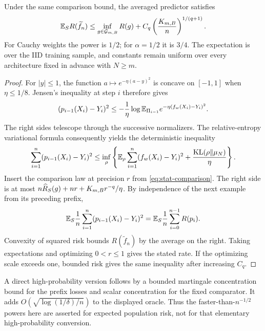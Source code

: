 \begin{corollary}
\label{cor:progressive-average}
Under the same comparison bound, the averaged predictor satisfies
\[
 \mathbb E_S R(\widetilde f_n)
 \le\inf_{g\in\mathcal G_{m,B}}R(g)
       +C_q\left(\frac{K_{m,B}}n\right)^{1/(q+1)}.
\]
For Cauchy weights the power is $1/2$; for $\alpha=1/2$ it is $3/4$. The expectation is over the IID training sample, and constants remain uniform over every architecture fixed in advance with $N\ge m$.
\end{corollary}
\begin{proof}
For $|y|\le1$, the function $a\mapsto e^{-\eta(a-y)^2}$ is concave on $[-1,1]$ when $\eta\le1/8$. Jensen's inequality at step $i$ therefore gives
\[
 (p_{i-1}(X_i)-Y_i)^2\le
 -\frac1\eta\log\mathbb E_{\Pi_{i-1}}e^{-\eta(f_w(X_i)-Y_i)^2}.
\]
The right sides telescope through the successive normalizers. The relative-entropy variational formula consequently yields the deterministic inequality
\[
 \sum_{i=1}^n(p_{i-1}(X_i)-Y_i)^2
 \le\inf_\rho\left\{\mathbb E_\rho\sum_{i=1}^n(f_w(X_i)-Y_i)^2
                          +\frac{\operatorname{KL}(\rho\Vert\mu_N)}\eta\right\}.
\]
Insert the comparison law at precision $r$ from \eqref{eq:stat-comparison}. The right side is at most
$n\widehat R_S(g)+nr+K_{m,B}r^{-q}/\eta$.
By independence of the next example from its preceding prefix,
\[
 \mathbb E_S\frac1n\sum_{i=1}^n(p_{i-1}(X_i)-Y_i)^2
     =\mathbb E_S\frac1n\sum_{i=0}^{n-1}R(p_i).
\]
Convexity of squared risk bounds $R(\widetilde f_n)$ by the average on the right. Taking expectations and optimizing $0<r\le1$ gives the stated rate. If the optimizing scale exceeds one, bounded risk gives the same inequality after increasing $C_q$.
\end{proof}

A direct high-probability version follows by a bounded martingale concentration bound for the prefix losses and scalar concentration for the fixed comparator. It adds $O(\sqrt{\log(1/\delta)/n})$ to the displayed oracle. Thus the faster-than-$n^{-1/2}$ powers here are asserted for expected population risk, not for that elementary high-probability conversion.
